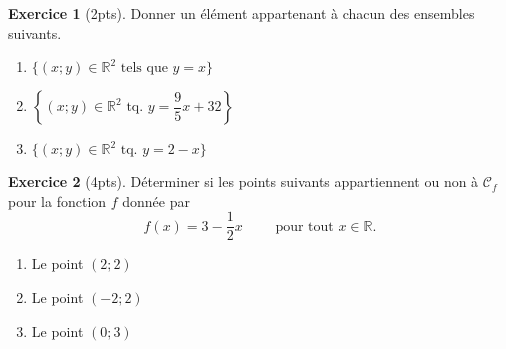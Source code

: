 \documentclass[12pt]{paper}
\theoremstyle{theorem}
\theoremstyle{definition}
\newtheorem{ex}{Exercice}
\newcommand{\C}{\mathcal{C}}
\newcommand{\R}{\mathbb{R}}
\newcommand{\exe}[2]{
		\begin{ex} #1  \end{ex}
		\begin{sol} #2 \end{sol}
	}
\newcommand{\exe}[2]{
		\begin{ex} #1  \end{ex}
	}
\begin{document}
\exe{[2pts]
	Donner un élément appartenant à chacun des ensembles suivants.
		\begin{multicols}{2}
		\begin{enumerate}
			\item $\{ (x;y) \in \R^2 \text{ tels que } y=x \}$
			\item $\left\{ (x;y) \in \R^2 \text{ tq. } y = \dfrac95 x + 32 \right\}$
			\item $\{ (x;y) \in \R^2 \text{ tq. } y=2-x \}$
		\end{enumerate}
		\end{multicols}
}{}

\exe{[4pts]
	Déterminer si les points suivants appartiennent ou non à $\C_f$ pour la fonction $f$ donnée par
		\[ f(x) =3 - \dfrac12x \qquad \text{ pour tout } x\in\R. \]
	\begin{multicols}{2}
	\begin{enumerate}
		\item Le point $(2;2)$
		\item Le point $(-2 ; 2)$
		\item Le point $(0;3)$
	\end{enumerate}
	\end{multicols}
}{}


\newpage
\end{document}
